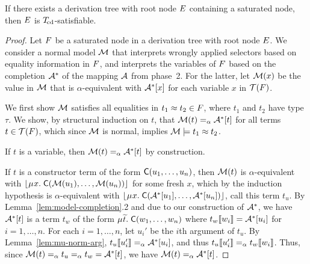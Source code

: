 \begin{theorem}%
\label{thm:ss}%
\afterDot
If there exists a derivation tree with root node $E$ containing a saturated node, then $E$ is $T_{\!\mathrm{cd}}$-satisfiable.
\end{theorem}
\begin{proof}
Let $F$ be a saturated node in a derivation tree with root node $E$.
We consider a normal model $\mathcal{M}$
that interprets wrongly applied selectors based on equality information in $F$,
and interprets the variables of $F$ based on the completion $\mathcal{A}^\ast$ of the mapping $\mathcal{A}$ from phase~2.
For the latter, let $\mathcal{M}( x )$ be the value in $\mathcal{M}$ that is $\alpha$-equivalent with $\mathcal{A}^\ast [x]$ for each variable $x$ in $\mathcal{T}(F)$.

We first show $\mathcal{M}$ satisfies all equalities in $t_1 \approx t_2 \in F$, where $t_1$ and $t_2$ have type $\tau$.
We show,
by structural induction on $t$,
that $\mathcal{M}( t ) \mathrel{=_\alpha} \mathcal{A}^\ast [t]$ for all terms $t \in \mathcal{T}( F )$,
which since $\mathcal{M}$ is normal, implies $\mathcal{M} \models t_1 \approx t_2$.

If $t$ is a variable, then $\mathcal{M}( t ) \mathrel{=_\alpha} \mathcal{A}^\ast [ t ]$ by construction.

If $t$ is a constructor term of the form $\textsf{C}( u_1, \ldots, u_n )$,
then $\mathcal{M}( t )$ is $\alpha$-equivalent with $\nf{\MU x.\; \const{C}( \M( u_1 ), \ldots, \M( u_n ) ) }$ for some fresh $x$,
which by the induction hypothesis is $\alpha$-equivalent with $\nf{\MU x.\; \const{C}( \Val^\ast \ec{ u_1 }, \ldots, \Val^\ast \ec{ u_n } )}$, call this term $t_u$.
By Lemma~\ref{lem:model-completion}.2 and due to our construction of $\mathcal{A}^\ast$, we have $\mathcal{A}^\ast [t]$ is a term
$t_w$ of the form $\MU {\Varec{t}}.\; \const{C}( w_1, \ldots, w_n )$
where $t_w\llbracket w_i \rrbracket = \mathcal{A}^\ast [u_i]$ for $i = 1, \ldots, n$.
For each $i = 1, \ldots, n$, let $u_i'$ be the $i$\vvthinspace th argument of $t_u$.
By Lemma~\ref{lem:mu-norm-arg}, $t_u\llbracket u_i' \rrbracket \mathrel{=_\alpha} \mathcal{A}^\ast [u_i]$,
and thus $t_u\llbracket u_i' \rrbracket \mathrel{=_\alpha} t_w\llbracket  w_i  \rrbracket$. %
Thus, since $\mathcal{M}( t ) \mathrel{=_\alpha} t_u \mathrel{=_\alpha} t_w = \mathcal{A}^\ast [t]$,
we have $\mathcal{M}( t ) \mathrel{=_\alpha} \mathcal{A}^\ast [t]$.


\end{proof}
